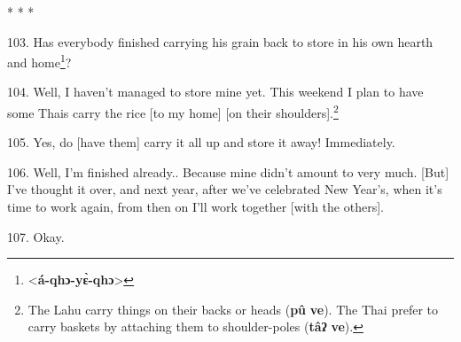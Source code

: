 \begin{center}
* * *
\end{center}

103. Has everybody finished carrying his grain back to store in his own hearth
and home\footnote{<\textbf{á-qhɔ-yɛ̀-qhɔ}>}?

104. Well, I haven't managed to store mine yet. This weekend I plan to have some
Thais carry the rice [to my home] [on their shoulders].\footnote{The Lahu carry things on their backs or heads (\textbf{pû} \textbf{ve}). The Thai prefer to carry baskets by attaching them to shoulder-poles (\textbf{tâʔ} \textbf{ve}).}

105. Yes, do [have them] carry it all up and store it away! Immediately.

106. Well, I'm finished already.. Because mine didn't amount to very much. [But]
I've thought it over, and next year, after we've celebrated New Year's, when it's
time to work again, from then on I'll work together [with the others].

107. Okay.

